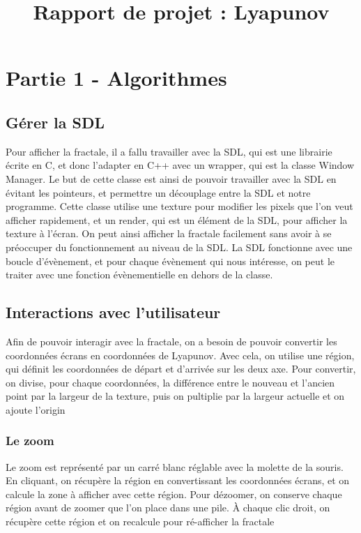 \documentclass{article}
\title{Rapport de projet : Lyapunov}
\date{}
\begin{document}
    \vspace*{-2pt}
    {\let\newpage\relax\maketitle} \thispagestyle{fancy}


\section* {Partie 1 - Algorithmes}
    \subsection*{Gérer la SDL}
    Pour afficher la fractale, il a fallu travailler avec la SDL, qui est une librairie écrite en C, et donc l'adapter en C++ avec un wrapper, qui est la classe Window Manager.
    Le but de cette classe est ainsi de pouvoir travailler avec la SDL en évitant les pointeurs, et permettre un découplage entre la SDL et notre programme.
    Cette classe utilise une texture pour modifier les pixels que l'on veut afficher rapidement, et un render, qui est un élément de la SDL, pour afficher la texture à l'écran.
    On peut ainsi afficher la fractale facilement sans avoir à se préoccuper du fonctionnement au niveau de la SDL.
    La SDL fonctionne avec une boucle d'évènement, et pour chaque évènement qui nous intéresse, on peut le traiter avec une fonction évènementielle en dehors de la classe.

    \subsection*{Interactions avec l'utilisateur}

    Afin de pouvoir interagir avec la fractale, on a besoin de pouvoir convertir les coordonnées écrans en coordonnées de Lyapunov.
    Avec cela, on utilise une région, qui définit les coordonnées de départ et d'arrivée sur les deux axe.
    Pour convertir, on divise, pour chaque coordonnées, la différence entre le nouveau et l'ancien point par la largeur de la texture, puis on pultiplie par la largeur actuelle et on ajoute l'origin

    \subsubsection*{Le zoom}

    Le zoom est représenté par un carré blanc réglable avec la molette de la souris.
    En cliquant, on récupère la région en convertissant les coordonnées écrans, et on calcule la zone à afficher avec cette région.
    Pour dézoomer, on conserve chaque région avant de zoomer que l'on place dans une pile.
    À chaque clic droit, on récupère cette région et on recalcule pour ré-afficher la fractale
\end{document}

